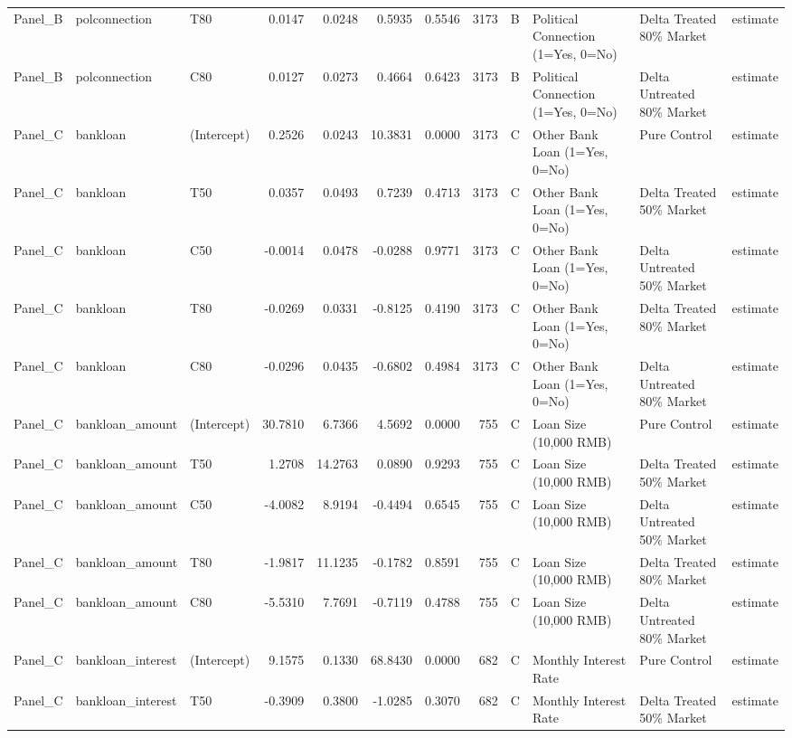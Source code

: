 \begin{table}
\begin{tabular}[t]{lllrrrrrllll}
Panel\_B & polconnection & T80 & 0.0147 & 0.0248 & 0.5935 & 0.5546 & 3173 & B & Political Connection (1=Yes, 0=No) & Delta Treated 80\% Market & estimate\\
Panel\_B & polconnection & C80 & 0.0127 & 0.0273 & 0.4664 & 0.6423 & 3173 & B & Political Connection (1=Yes, 0=No) & Delta Untreated 80\% Market & estimate\\
\addlinespace
Panel\_C & bankloan & (Intercept) & 0.2526 & 0.0243 & 10.3831 & 0.0000 & 3173 & C & Other Bank Loan (1=Yes, 0=No) & Pure Control & estimate\\
Panel\_C & bankloan & T50 & 0.0357 & 0.0493 & 0.7239 & 0.4713 & 3173 & C & Other Bank Loan (1=Yes, 0=No) & Delta Treated 50\% Market & estimate\\
Panel\_C & bankloan & C50 & -0.0014 & 0.0478 & -0.0288 & 0.9771 & 3173 & C & Other Bank Loan (1=Yes, 0=No) & Delta Untreated 50\% Market & estimate\\
Panel\_C & bankloan & T80 & -0.0269 & 0.0331 & -0.8125 & 0.4190 & 3173 & C & Other Bank Loan (1=Yes, 0=No) & Delta Treated 80\% Market & estimate\\
Panel\_C & bankloan & C80 & -0.0296 & 0.0435 & -0.6802 & 0.4984 & 3173 & C & Other Bank Loan (1=Yes, 0=No) & Delta Untreated 80\% Market & estimate\\
\addlinespace
Panel\_C & bankloan\_amount & (Intercept) & 30.7810 & 6.7366 & 4.5692 & 0.0000 & 755 & C & Loan Size (10,000 RMB) & Pure Control & estimate\\
Panel\_C & bankloan\_amount & T50 & 1.2708 & 14.2763 & 0.0890 & 0.9293 & 755 & C & Loan Size (10,000 RMB) & Delta Treated 50\% Market & estimate\\
Panel\_C & bankloan\_amount & C50 & -4.0082 & 8.9194 & -0.4494 & 0.6545 & 755 & C & Loan Size (10,000 RMB) & Delta Untreated 50\% Market & estimate\\
Panel\_C & bankloan\_amount & T80 & -1.9817 & 11.1235 & -0.1782 & 0.8591 & 755 & C & Loan Size (10,000 RMB) & Delta Treated 80\% Market & estimate\\
Panel\_C & bankloan\_amount & C80 & -5.5310 & 7.7691 & -0.7119 & 0.4788 & 755 & C & Loan Size (10,000 RMB) & Delta Untreated 80\% Market & estimate\\
\addlinespace
Panel\_C & bankloan\_interest & (Intercept) & 9.1575 & 0.1330 & 68.8430 & 0.0000 & 682 & C & Monthly Interest Rate & Pure Control & estimate\\
Panel\_C & bankloan\_interest & T50 & -0.3909 & 0.3800 & -1.0285 & 0.3070 & 682 & C & Monthly Interest Rate & Delta Treated 50\% Market & estimate\\

\end{tabular}
\end{table}
